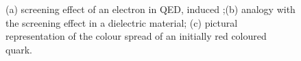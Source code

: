 \documentclass[ALICE,manyauthors]{cernphprep}
\begin{document}
\begin{figure}[t]
\begin{center}
\end{center}
\caption{(a) screening effect of an electron in QED, induced ;(b) analogy with the screening effect in a dielectric material; (c) pictural representation of the colour spread of an initially red coloured quark. }
\label{fig:ProbingTestCHarge}
\end{figure}
\end{document}

